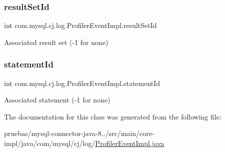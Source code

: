 \subsubsection{\texorpdfstring{result\+Set\+Id}{resultSetId}}
{\footnotesize\ttfamily int com.\+mysql.\+cj.\+log.\+Profiler\+Event\+Impl.\+result\+Set\+Id\hspace{0.3cm}{\ttfamily [protected]}}

Associated result set (-\/1 for none) \mbox{\label{classcom_1_1mysql_1_1cj_1_1log_1_1_profiler_event_impl_af16efdf6c64d552484266a63d97fd77d}} 
\subsubsection{\texorpdfstring{statement\+Id}{statementId}}
{\footnotesize\ttfamily int com.\+mysql.\+cj.\+log.\+Profiler\+Event\+Impl.\+statement\+Id\hspace{0.3cm}{\ttfamily [protected]}}

Associated statement (-\/1 for none) 

The documentation for this class was generated from the following file\+:\begin{DoxyCompactItemize}
\item 
pruebas/mysql-\/connector-\/java-\/8../src/main/core-\/impl/java/com/mysql/cj/log/\mbox{\hyperlink{_profiler_event_impl_8java}{Profiler\+Event\+Impl.\+java}}\end{DoxyCompactItemize}
